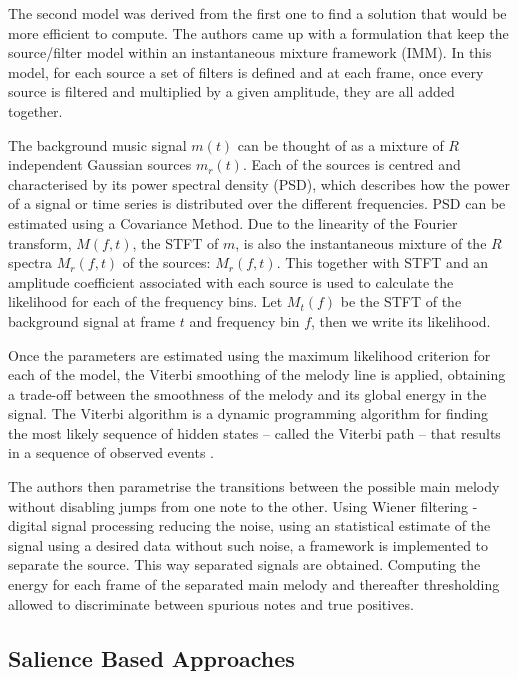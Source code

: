 The second model was derived from the first one to find a solution that would be more efficient to compute. The authors came up with a formulation that keep the source/filter model within an instantaneous mixture framework (IMM). In this model, for each source a set of filters is defined and at each frame, once every source is filtered and multiplied by a given amplitude, they are all added together.

The background music signal $m(t)$ can be thought of as a mixture of $R$ independent Gaussian sources $m_{r}(t)$. 
Each of the sources is centred and characterised by its power spectral density (PSD), which describes how the power of a signal or time series is distributed over the different frequencies. PSD can be estimated using a Covariance Method.
Due to the linearity of the Fourier transform, $M(f,t)$, the STFT of $m$, is also the instantaneous mixture of the $R$ spectra $M_{r}(f,t)$ of the sources: $M_{r}(f,t)$.
This together with STFT and an amplitude coefficient associated with each source is used to calculate the likelihood for each of the frequency bins. Let $M_{t}(f)$ be the STFT of the background signal at frame $t$ and frequency bin $f$, then we write its likelihood.

Once the parameters are estimated using the maximum likelihood criterion for each of the model, the Viterbi smoothing of the melody line is applied, obtaining a trade-off between the smoothness of the melody and its global energy in the signal. The Viterbi algorithm is a dynamic programming algorithm for finding the most likely sequence of hidden states – called the Viterbi path – that results in a sequence of observed events \cite{viterbi}.
 
The authors then parametrise the transitions between the possible main melody without disabling jumps from one note to the other. Using Wiener filtering - digital signal processing reducing the noise, using an statistical estimate of the signal using a desired data without such noise, a framework is implemented to separate the source. This way separated signals are obtained. Computing the energy for each frame of the separated main melody and thereafter thresholding allowed to discriminate between spurious notes and true positives.

\vspace{10pt}


\subsection{Salience Based Approaches}

